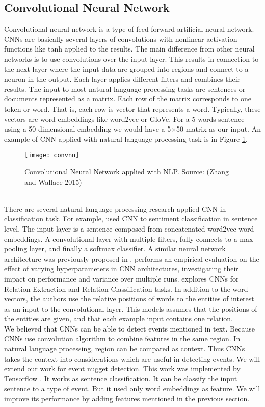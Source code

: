 \subsection{Convolutional Neural Network}
Convolutional neural network is a type of feed-forward artificial neural network. CNNs are basically several layers of convolutions with nonlinear activation functions like tanh applied to the results. The main difference from other neural networks is to use convolutions over the input layer. This results in connection to the next layer where the input data are grouped into regions and  connect to a neuron in the output. Each layer applies different filters and combines their results. 
The input to most natural language processing tasks are sentences or documents represented as a matrix. Each row of the matrix corresponds to one token or word. That is, each row is vector that represents a word. Typically, these vectors are word embeddings like word2vec or GloVe. For a 5 words sentence using a 50-dimensional embedding we would have a 5×50 matrix as our input. An example of CNN applied with natural language processing task is in Figure \ref{fig:convnn}.
\begin{figure}
    \centering
    \texttt{[image: convnn]}
    \caption{Convolutional Neural Network applied with NLP. Source: (Zhang and Wallace 2015)}
    \label{fig:convnn}    
\end{figure}\\
\indent There are several natural language processing research applied CNN in classification task. For example, \cite{kim2014convolutional} used CNN to sentiment classification in sentence level. The input layer is a sentence composed from concatenated word2vec word embeddings. A convolutional layer with multiple filters, fully connects to a max-pooling layer, and finally a softmax classifier. A similar neural network architecture was previously proposed in \cite{kalchbrenner2014convolutional}. \cite{zhang2015sensitivity} performs an empirical evaluation on the effect of varying hyperparameters in CNN architectures, investigating their impact on performance and variance over multiple runs. \cite{nguyen2015relation} explores CNNs for  Relation Extraction and Relation Classification tasks. In addition to the word vectors, the authors use the relative positions of words to the entities of interest as an input to the convolutional layer. This models assumes that the positions of the entities are given, and that each example input contains one relation.\\
\indent We believed that CNNs can be able to detect events mentioned in text. Because CNNs use convolution algorithm to combine features in the same region. In natural language processing, region can be compared as context. Thus CNNs takes the context into considerations which are useful in detecting events. We will extend our work \cite{satyapanich2016event} for event nugget detection. This work was implemented by Tensorflow \cite{tensorflow2015-whitepaper}. It works as sentence classification. It can be classify the input sentence to a type of event. But it used only word embeddings as feature. We will improve its performance by adding features mentioned in the previous section.

